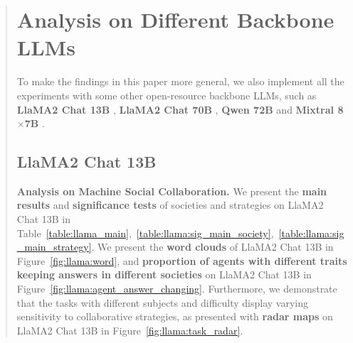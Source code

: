 \documentclass[11pt]{article}
\begin{document}
\begin{abstract}
\clearpage



% 



\section{Analysis on Different Backbone LLMs}
\label{app:backbone_llm}

To make the findings in this paper more general, we also implement all the experiments with some other open-resource backbone LLMs, such as \textbf{LlaMA2 Chat 13B} \citep{arXiv2023_LLaMA}, \textbf{LlaMA2 Chat 70B } \citep{arXiv2023_LLaMA}, \textbf{Qwen 72B} \citep{arXiv2023_Qwen} and \textbf{Mixtral 8$\times$7B} \citep{arXiv2023_Mistral,arXiv2024_Mixtral}. 


\subsection{LlaMA2 Chat 13B}
\label{app:backbone_llama13b}

\textbf{Analysis on Machine Social Collaboration.} 
We present the \textbf{main results} and \textbf{significance tests} of societies and strategies on LlaMA2 Chat 13B in Table~\ref{table:llama_main},~\ref{table:llama:sig_main_society},~\ref{table:llama:sig_main_strategy}. 
We present the \textbf{word clouds} of LlaMA2 Chat 13B in Figure~\ref{fig:llama:word}, and \textbf{proportion of agents with different traits keeping answers in different societies} on LlaMA2 Chat 13B in Figure~\ref{fig:llama:agent_answer_changing}. 
Furthermore, we demonstrate that the tasks with different subjects and difficulty display varying sensitivity to collaborative strategies, as presented with \textbf{radar maps} on LlaMA2 Chat 13B in Figure~\ref{fig:llama:task_radar}. 

% 
% 
% 


\end{abstract}
\end{document}
